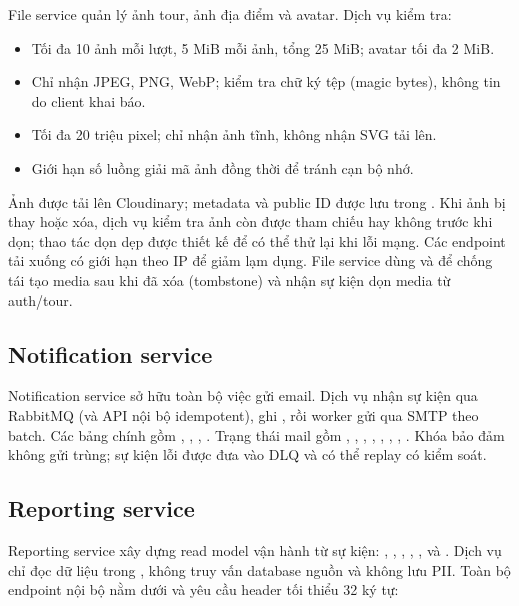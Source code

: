 File service quản lý ảnh tour, ảnh địa điểm và avatar. Dịch vụ kiểm tra:

\begin{itemize}
  \item Tối đa 10 ảnh mỗi lượt, 5 MiB mỗi ảnh, tổng 25 MiB; avatar tối đa 2 MiB.
  \item Chỉ nhận JPEG, PNG, WebP; kiểm tra chữ ký tệp (magic bytes), không tin  do client khai báo.
  \item Tối đa 20 triệu pixel; chỉ nhận ảnh tĩnh, không nhận SVG tải lên.
  \item Giới hạn số luồng giải mã ảnh đồng thời để tránh cạn bộ nhớ.
\end{itemize}

Ảnh được tải lên Cloudinary; metadata và public ID được lưu trong . Khi ảnh bị thay hoặc xóa, dịch vụ kiểm tra ảnh còn được tham chiếu hay không trước khi dọn; thao tác dọn dẹp được thiết kế để có thể thử lại khi lỗi mạng. Các endpoint tải xuống có giới hạn theo IP để giảm lạm dụng. File service dùng  và  để chống tái tạo media sau khi đã xóa (tombstone) và nhận sự kiện dọn media từ auth/tour.

\subsection{Notification service}
\label{subsec:notification-service}

Notification service sở hữu toàn bộ việc gửi email. Dịch vụ nhận sự kiện qua RabbitMQ (và API nội bộ idempotent), ghi , rồi worker gửi qua SMTP theo batch. Các bảng chính gồm , , , . Trạng thái mail gồm , , , , , , , . Khóa  bảo đảm không gửi trùng; sự kiện lỗi được đưa vào DLQ và có thể replay có kiểm soát.

\subsection{Reporting service}
\label{subsec:reporting-service}

Reporting service xây dựng read model vận hành từ sự kiện: , , , , ,  và . Dịch vụ chỉ đọc dữ liệu trong , không truy vấn database nguồn và không lưu PII. Toàn bộ endpoint nội bộ nằm dưới  và yêu cầu header  tối thiểu 32 ký tự:

